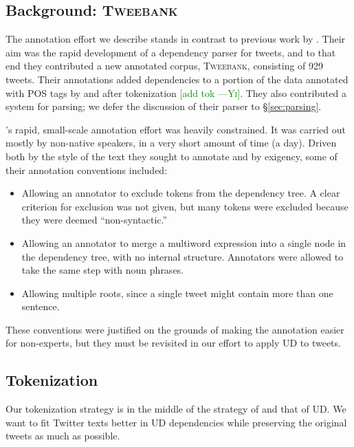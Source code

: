 \documentclass[11pt,a4paper]{article}
\newcommand{\yicomment}[1]{\textcolor{green}{[#1 ---\textsc{Yi}]}}
\begin{document}
\subsection{Background: \textsc{Tweebank}}\label{sec:tweebank}

The annotation effort we describe stands in contrast to previous work
by .  Their aim was the rapid
development of a dependency parser for tweets, and to that end they
contributed a new annotated corpus, \textsc{Tweebank}, consisting of
929 tweets.  Their annotations added dependencies to a portion of the data
annotated with POS tags by 
 and
 after tokenization \citep{ICWSM101540} \yicomment{add tok}.  
They also contributed a system for parsing;
we defer the discussion of their parser to \S\ref{sec:parsing}.

\citet{kong-EtAl:2014:EMNLP2014}'s rapid, small-scale annotation effort was heavily constrained.  It was
carried out mostly by non-native speakers, in a very short amount of
time (a day).  Driven both by the style of the text they sought to annotate
and by exigency, some of their annotation conventions included:
\begin{itemize}
\item Allowing an annotator to exclude tokens from the dependency
  tree.  A clear criterion for exclusion was not given, but many
  tokens were excluded because they were deemed ``non-syntactic.''
\item Allowing an annotator to merge a multiword expression into a
  single node in the dependency tree, with no internal structure.
  Annotators were allowed to take the same step with noun phrases.
\item Allowing multiple roots, since a single tweet might contain more
  than one sentence.
\end{itemize}
These conventions were justified on the grounds of making the
annotation easier for non-experts, but they must be revisited in our
effort to apply UD to tweets.

\subsection{Tokenization}\label{sec:tok-anno}
Our tokenization strategy is in the middle of the strategy of \citet{ICWSM101540} and that of UD. 
We want to fit Twitter texts better in UD dependencies while preserving the original tweets as much as possible.
\end{document}
